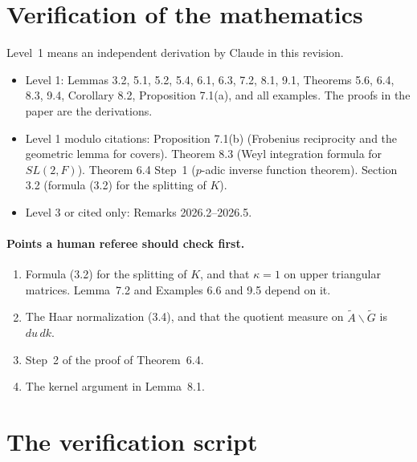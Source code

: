 \documentclass[12pt,letterpaper]{article}
\newcommand{\Gt}{\widetilde G}
\newcommand{\At}{\widetilde A}
\begin{document}
\section{Verification of the mathematics}\label{sec:levels}

Level~1 means an independent derivation by Claude in this revision.

\begin{itemize}[leftmargin=*]
\item Level 1: Lemmas 3.2, 5.1, 5.2, 5.4, 6.1, 6.3, 7.2, 8.1, 9.1,
  Theorems 5.6, 6.4, 8.3, 9.4, Corollary 8.2, Proposition 7.1(a), and
  all examples. The proofs in the paper are the derivations.
\item Level 1 modulo citations: Proposition 7.1(b) (Frobenius
  reciprocity and the geometric lemma for covers). Theorem 8.3 (Weyl
  integration formula for $SL(2,F)$). Theorem 6.4 Step~1 ($p$-adic
  inverse function theorem). Section 3.2 (formula (3.2) for the
  splitting of $K$).
\item Level 3 or cited only: Remarks 2026.2--2026.5.
\end{itemize}

\paragraph{Points a human referee should check first.}
\begin{enumerate}[leftmargin=*]
\item Formula (3.2) for the splitting of $K$, and that $\kappa=1$ on
  upper triangular matrices. Lemma~7.2 and Examples 6.6 and 9.5 depend
  on it.
\item The Haar normalization (3.4), and that the quotient measure on
  $\At\backslash\Gt$ is $du\,dk$.
\item Step~2 of the proof of Theorem~6.4.
\item The kernel argument in Lemma~8.1.
\end{enumerate}

\section{The verification script}\label{sec:script}
\end{document}
